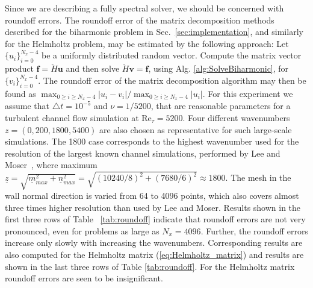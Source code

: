 \documentclass[11pt, oneside]{elsarticle}
\newcommand{\N}[1]{\check{#1}}
\begin{document}
Since we are describing a fully spectral solver, we should be concerned with roundoff errors. The roundoff error of the matrix decomposition methods 
described for the biharmonic problem in Sec.~\ref{sec:implementation}, and similarly for the Helmholtz problem, may be estimated 
by the following approach: Let $\{u_i\}_{i=0}^{N_x-4}$ be a uniformly distributed 
random vector. Compute the matrix vector product $\bm{f}=\N{H}\bm{u}$ and 
then solve $\N{H} \bm{v} = \bm{f}$, using Alg. \ref{alg:SolveBiharmonic}, for 
$\{v_i\}_{i=0}^{N_x-4}$. The roundoff error of the matrix decomposition 
algorithm may then be found as $\max_{0 \ge i \ge N_x-4}|u_i-v_i|/\max_{0 \ge i 
\ge N_x-4}|u_i|$. For this experiment we assume that $\triangle t= 10^{-5}$ 
and $\nu=1/5200$, that are reasonable parameters for a turbulent channel flow 
simulation at $\text{Re}_{\tau}=5200$. Four different wavenumbers 
$z=(0, 200, 1800, 5400)$ are 
also chosen as representative for such large-scale simulations. The 1800 case corresponds to the highest wavenumber used for the resolution 
of the largest known channel simulations, performed by Lee and 
Moser~\cite{leemoser15}, where maximum $\underline{z} = \sqrt{\underline{m}_{max}^2+\underline{n}_{max}^2} = \sqrt{(10240/8)^2 + (7680/6)^2} \approx 1800$. The mesh in the wall normal direction 
is varied from 64 to 4096 points, which also covers almost three times higher 
resolution than used by Lee and Moser. Results shown in the 
first three rows of Table ~\ref{tab:roundoff} indicate that 
roundoff errors are not very pronounced, even for problems as large as 
$N_x=4096$. Further, the roundoff errors increase only slowly with increasing 
the wavenumbers. Corresponding results are also computed for the Helmholtz 
matrix (\ref{eq:Helmholtz_matrix}) and 
results are shown in the last three rows of Table \ref{tab:roundoff}. For 
the Helmholtz matrix roundoff errors are seen to be insignificant.
\end{document}
